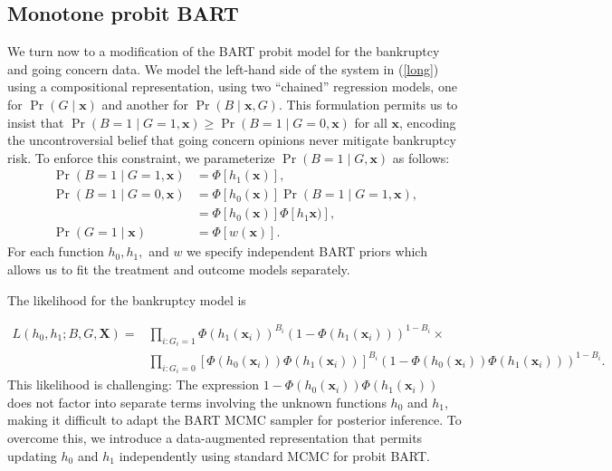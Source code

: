 \documentclass[aoas,preprint, 11pt, dvipsnames, table, x11name]{imsart}
\theoremstyle{remark}
\begin{document}
\subsection{Monotone probit BART}
We turn now to a modification of the BART probit model for the bankruptcy and going concern data. We model the left-hand side of the system in (\ref{long}) using a compositional representation, using two ``chained'' regression models, one for $\Pr(G \mid \mathbf{x})$ and another for $\Pr(B \mid \mathbf{x}, G)$. This formulation permits us to insist that $\Pr(B=1\mid G=1, \mathbf{x}) \geq \Pr(B=1\mid G=0, \mathbf{x})$ for all $\mathbf{x}$, encoding the uncontroversial belief that going concern opinions never mitigate bankruptcy risk. To enforce this constraint, we parameterize $\Pr(B=1\mid G, \mathbf{x})$ as follows:
\begin{equation}
    \begin{split}
\Pr(B=1\mid G=1, \mathbf{x}) &= \Phi[h_1(\mathbf{x})],\\
\Pr(B=1\mid G=0, \mathbf{x}) &= \Phi[h_0(\mathbf{x})]\Pr(B=1\mid G=1, \mathbf{x}),
\\ &= \Phi[h_0(\mathbf{x})]\Phi[h_1\mathbf{x})],\\
\Pr(G=1\mid \mathbf{x}) &= \Phi[w(\mathbf{x})].
\end{split}
\end{equation}
For each function $h_0, h_1,$ and $w$ we specify independent BART priors which allows us to fit the treatment and outcome models separately. 

The likelihood for the bankruptcy model is

\begin{equation}
\begin{split}
L(h_0, h_1; B, G, \mathbf{X}) =&\prod_{i: G_i=1}\Phi(h_1(\mathbf{x}_i))^{B_i}(1-\Phi(h_1(\mathbf{x}_i)))^{1-B_i} \times \\
&\prod_{i: G_i=0}[\Phi(h_0(\mathbf{x}_i))\Phi(h_1(\mathbf{x}_i))]^{B_i} (1-\Phi(h_0(\mathbf{x}_i))\Phi(h_1(\mathbf{x}_i)))^{1-B_i}\label{eq:bart-da0}.
\end{split}
\end{equation}
This likelihood is challenging: The expression $1- \Phi(h_0(\mathbf{x}_i))\Phi(h_1(\mathbf{x}_i))$ does not factor into separate terms involving the unknown functions $h_0$ and $h_1$, making it difficult to adapt the BART MCMC sampler for posterior inference. To overcome this, we introduce a data-augmented representation that permits updating $h_0$ and $h_1$ independently using standard MCMC for probit BART. 
\end{document}
